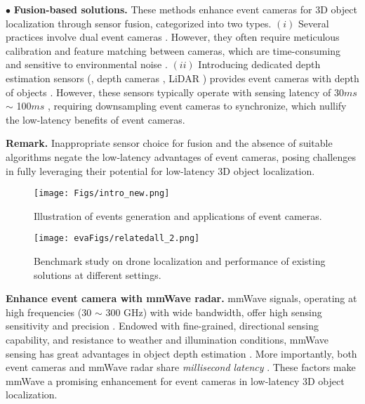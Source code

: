 \noindent $\bullet$ \textbf{Fusion-based solutions.}
These methods enhance event cameras for 3D object localization through sensor fusion, categorized into two types.
$(i)$ Several practices involve dual event cameras \cite{zhou2021event, xu2023taming}. 
However, they often require meticulous calibration and feature matching between cameras, which are time-consuming and sensitive to environmental noise \cite{falanga2020dynamic}.
$(ii)$ Introducing dedicated depth estimation sensors (\eg, depth cameras \cite{he2021fast}, LiDAR \cite{cui2022dense}) provides event cameras with depth of objects \cite{li2022motion}. 
However, these sensors typically operate with sensing latency of 30$ms$ $\sim$ 100$ms$ \cite{li2023leovr}, requiring downsampling event cameras to synchronize, which nullify the low-latency benefits of event cameras.

\noindent \textbf{Remark.}
Inappropriate sensor choice for fusion and the absence of suitable algorithms negate the low-latency advantages of event cameras, posing challenges in fully leveraging their potential for low-latency 3D object localization.

\begin{figure}[t]
    \setlength{\abovecaptionskip}{0.25cm} %
    \setlength{\belowcaptionskip}{-0.3cm}
    \setlength{\subfigcapskip}{-0.25cm}
    \centering
        \texttt{[image: Figs/intro\_new.png]}
        \vspace{-0.2cm}
    \caption{Illustration of events generation and applications of event cameras.}
    \label{intro}
    \vspace{-0.3cm}
\end{figure} 

\begin{figure*}[t]
    \setlength{\abovecaptionskip}{0.2cm} %
    \setlength{\belowcaptionskip}{-0.3cm}
    \setlength{\subfigcapskip}{-0.25cm}
    \centering
        \texttt{[image: evaFigs/relatedall\_2.png]}
        \vspace{-0.2cm}
    \caption{Benchmark study on drone localization and performance of existing solutions at different settings.}
    \label{relatedwork}
    \vspace{-0.2cm}
\end{figure*} 

\noindent \textbf{Enhance event camera with mmWave radar.}
mmWave signals, operating at high frequencies (30 $\sim$ 300 GHz) with wide bandwidth, offer high sensing sensitivity and precision \cite{fiandrino2019scaling, zhang2023survey}.
Endowed with fine-grained, directional sensing capability, and resistance to weather and illumination conditions, mmWave sensing has great advantages in object depth estimation \cite{sie2023batmobility, iizuka2023millisign, lu2020see, lu2020milliego}.
More importantly, both event cameras and mmWave radar share \textit{millisecond latency} \cite{mmWaveUser}. These factors make mmWave a promising enhancement for event cameras in low-latency 3D object localization.

